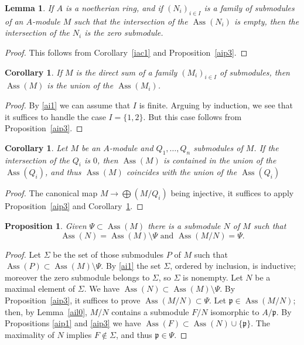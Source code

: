 \documentclass[12pt,letterpaper]{article}%
\newcommand{\oo}{\operatorname}\newcommand{\ooo}{\operatorname*}
\newcommand{\mf}{\mathfrak}
\newcommand{\ppp}{\mf p}
\newcommand{\Ass}{\oo{Ass}}
\newtheorem{cor}[thm]{Corollary}
\newtheorem{lem}[thm]{Lemma}
\newtheorem{prop}[thm]{Proposition}
\begin{document}
\begin{lem}\label{aimyl1}
If $A$ is a noetherian ring, and if $(N_i)_{i\in I}$ is a family of submodules of an $A$-module $M$ such that the intersection of the $\Ass(N_i)$ is empty, then the intersection of the $N_i$ is the zero submodule.
\end{lem}
\begin{proof}
This follows from Corollary~\ref{iac1} and Proposition~\ref{aip3}.
\end{proof}

\begin{cor}\label{aic1}
If $M$ is the direct sum of a family $(M_i)_{i\in I}$ of submodules, then $\Ass(M)$ is the union of the $\Ass(M_i)$.
\end{cor}
\begin{proof}
By \eqref{ai1} we can assume that $I$ is finite. Arguing by induction, we see that it suffices to handle the case $I=\{1,2\}$. But this case follows from Proposition~\ref{aip3}.
\end{proof}

\begin{cor}\label{aimc11}
Let $M$ be an $A$-module and $Q_1,\dots,Q_n$ submodules of $M$. If the intersection of the $Q_i$ is $0$, then $\Ass(M)$ is contained in the union of the $\Ass(Q_i)$, and thus $\Ass(M)$ coincides with the union of the $\Ass(Q_i)$
\end{cor}
\begin{proof}
The canonical map $M\to\bigoplus(M/Q_i)$ being injective, it suffices to apply Proposition~\ref{aip3} and Corollary~\ref{aic1}.
\end{proof}

\begin{prop}\label{aip4}
Given $\Psi\subset\Ass(M)$ there is a submodule $N$ of $M$ such that 
$$
\Ass(N)=\Ass(M)\setminus\Psi\text{ and }\Ass(M/N)=\Psi.
$$ 
\end{prop}
\begin{proof}
Let $\Sigma$ be the set of those submodules $P$ of $M$ such that $\Ass(P)\subset\Ass( M )\setminus\Psi$. By \eqref{ai1} the set $\Sigma$, ordered by inclusion, is inductive; moreover the zero submodule belongs to $\Sigma$, so $\Sigma$ is nonempty. Let $N$ be a maximal element of $\Sigma$. We have $\Ass(N)\subset\Ass( M )\setminus\Psi$. By Proposition~\ref{aip3}, it suffices to prove $\Ass(M/N)\subset\Psi$. Let $\ppp\in\Ass(M/N)$; then, by Lemma~\ref{ail0}, $M/N$ contains a submodule $F/N$ isomorphic to $A/\ppp$. By Propositions \ref{aip1} and \ref{aip3} we have $\Ass(F)\subset\Ass(N)\cup\{\ppp\}$. The maximality of $N$ implies $F\notin\Sigma$, and thus $\ppp\in\Psi$.
\end{proof}
\end{document}
